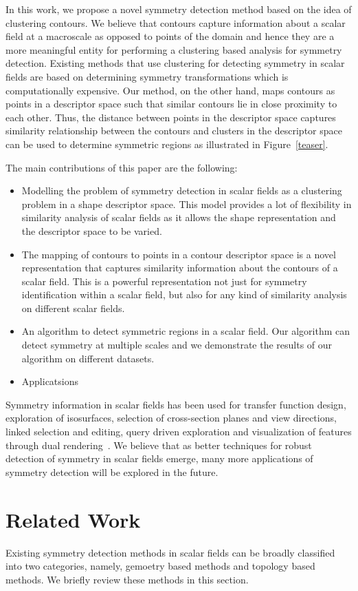 \documentclass[review,journal]{vgtc}         %
\begin{document}
In this work, we propose a novel symmetry detection method based on the idea of
clustering contours. We believe that contours capture information about a
scalar field at a macroscale as opposed to points of the domain and hence they
are a more meaningful entity for performing a clustering based analysis for
symmetry detection. Existing methods that use clustering for detecting symmetry
in scalar fields are based on determining symmetry transformations which is 
computationally expensive. Our method, on the other hand, maps contours as
points in a descriptor space such that similar contours lie in close proximity
to each other.  Thus, the distance between points in the descriptor space 
captures similarity relationship between the contours and clusters in the 
descriptor space can be used to determine symmetric regions as illustrated in
Figure~\ref{teaser}. 

The main contributions of this paper are the following:
\begin{itemize}
\item Modelling the problem of symmetry detection in scalar fields
as a clustering problem in a shape descriptor space. This model
provides a lot of flexibility in similarity analysis of scalar fields
as it allows the shape representation and the descriptor space to be varied.
\item The mapping of contours to points in a contour descriptor space is a novel
representation that captures similarity information about the contours of a 
scalar field. This is a powerful representation not just for symmetry identification
within a scalar field, but also for any kind of similarity analysis on different
scalar fields.
\item An algorithm to detect symmetric regions in a scalar field. Our algorithm
can detect symmetry at multiple scales and we demonstrate the results of our algorithm
on different datasets.
\item Applicatsions
\end{itemize}
Symmetry information in scalar fields
has been used for transfer function design, exploration of isosurfaces, selection of cross-section
planes and view directions, linked selection and editing, query driven exploration
and visualization of features through dual rendering~\cite{}.
We believe that as better techniques for robust detection of symmetry in scalar fields emerge,
many more applications of symmetry detection will be explored in the future.
\section{Related Work}
Existing symmetry detection methods in scalar fields can be broadly classified into two
categories, namely, gemoetry based methods and topology based methods. We briefly review
these methods in this section.
\end{document}
